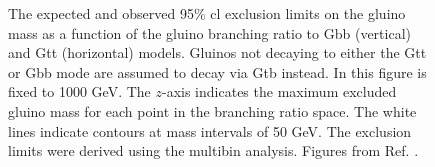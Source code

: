 \begin{figure}[htbp]
  \centering 
  \caption{The  expected  and  observed 95\% \gls{cl} exclusion limits on the gluino mass as a function of the gluino branching ratio to Gbb (vertical) and Gtt (horizontal) models. Gluinos not decaying to either the Gtt or Gbb mode are assumed to decay via Gtb instead. In this figure \mchi is fixed to 1000 GeV. The $z$-axis indicates the maximum excluded gluino mass for each point in the branching ratio space. The white lines indicate contours at mass intervals of 50 GeV. The exclusion limits were derived using the multibin analysis.
  Figures from Ref. \cite{ATLAS-CONF-2018-041}.}
  \label{fig:limits_triangle_1000}
\end{figure}


